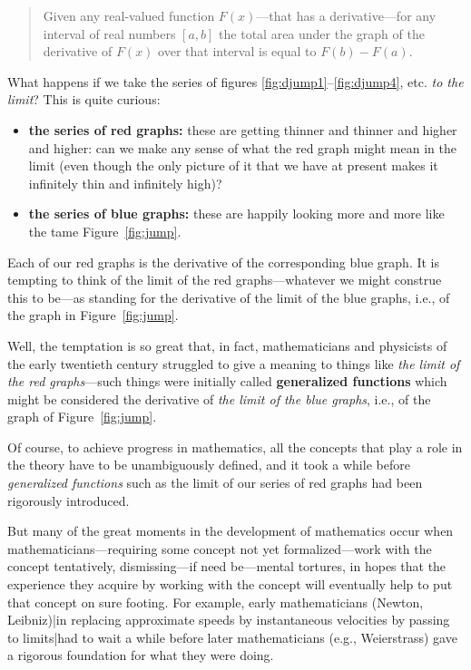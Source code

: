 \documentclass[openany]{book}
\theoremstyle{plain}
\theoremstyle{definition}
\begin{document}
\begin{quote} Given any real-valued function $F(x)$---that has a
  derivative---for any interval of real numbers $[a,b]$ the total area
  under the graph of the derivative of $F(x)$ over that interval is
  equal to $F(b)-F(a)$.
  \end{quote}
    What happens if we take the series of figures \ref{fig:djump1}--\ref{fig:djump4}, etc.
    {\it to the limit}?  This is quite curious:

  \begin{itemize}
  \item {\bf the series of red graphs:} these are getting thinner and
    thinner and higher and higher: can we make any sense of what the
    red graph might mean in the limit (even though the only picture of
    it that we have at present makes it infinitely thin and infinitely
    high)?

  \item {\bf the series of blue graphs:} these are happily looking
    more and more like the tame Figure~\ref{fig:jump}.
   \end{itemize}

   Each of our red graphs is the derivative of the corresponding blue
   graph. It is tempting to think of the limit of the red
   graphs---whatever we might construe this to be---as standing for
   the derivative of the limit of the blue graphs, i.e., of the graph
   in Figure~\ref{fig:jump}.

   Well, the temptation is so great that, in fact, mathematicians and
   physicists of the early twentieth century struggled to give a
   meaning to things like {\it the limit of the red graphs}---such
   things were initially called {\bf generalized functions} which
   might be considered the derivative of {\it the limit of the blue
     graphs}, i.e., of the graph of Figure~\ref{fig:jump}.


   Of course, to achieve progress in mathematics, all the concepts
   that play a role in the theory have to be unambiguously defined,
   and it took a while before {\it generalized functions} such as the
   limit of our series of red graphs had been rigorously introduced.

   But many of the great moments in the development of mathematics
   occur when mathematicians---requiring some concept not yet
   formalized---work with the concept tentatively, dismissing---if
   need be---mental tortures, in hopes that the experience they
   acquire by working with the concept will eventually help to put
   that concept on sure footing. For example, early mathematicians
   (Newton, Leibniz)|in replacing approximate speeds by instantaneous
   velocities by passing to limits|had to wait a while before later
   mathematicians (e.g., Weierstrass) gave a rigorous foundation for
   what they were doing.
\end{document}
